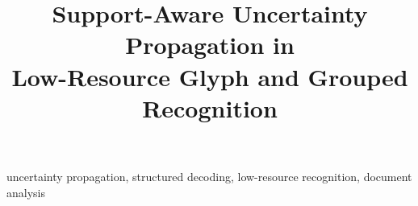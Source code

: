 \documentclass[conference]{IEEEtran}
\begin{document}
\title{Support-Aware Uncertainty Propagation in\\Low-Resource Glyph and Grouped Recognition}

\author{
}

\maketitle

\begin{abstract}

\end{abstract}

\begin{IEEEkeywords}
uncertainty propagation, structured decoding, low-resource recognition, document analysis
\end{IEEEkeywords}









\clearpage
\appendices




\end{document}

